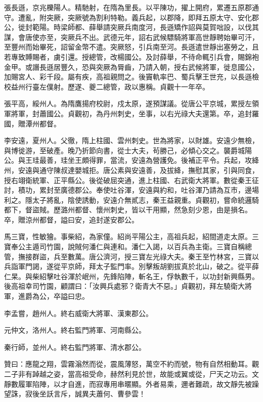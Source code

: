 \begin{pinyinscope}
 張長遜，京兆櫟陽人。精馳射，在隋為里長。以平陳功，擢上開府，累遷五原郡通守。遭亂，附突厥，突厥號為割利特勒。義兵起，以郡降，即拜五原太守、安化郡公，徙封範陽。時梁師都、薛舉請突厥兵南度河，長遜矯作詔與莫賀咄設，以伐其謀，會唐使亦至，突厥兵不出。武德元年，詔右武候驃騎將軍高世靜聘始畢可汗，至豐州而始畢死，詔留金幣不遣。突厥怒，引兵南至河。長遜遣世靜出塞勞之，且若專致賻賜者，虜引還。授總管，改楊國公。及討薛舉，不待命輒引兵會，賜錦袍金甲。或譖長遜居豐久，恐與突厥為脣齒，乃請入朝，授右武候將軍，徙息國公，加賜宮人、彩千段。屬有疾，高祖親問之。後竇軌率巴、蜀兵擊王世充，以長遜檢校益州行臺左僕射。歷遂、夔二總管，政以惠稱。貞觀十一年卒。



 張平高，綏州人。為隋鷹揚府校尉，戍太原，遂預謀議。從唐公平京城，累授左領軍將軍，封蕭國公。貞觀初，為丹州刺史，坐事，以右光祿大夫還第。卒，追封羅國，贈潭州都督。



 李安遠，夏州人。父徹，隋上柱國、雲州刺史。世為將家，以財雄。安遠少無檢，與博徙游，至破產。晚乃折節向書，從士大夫，茍勝己，必傾心交之。襲爵城陽公。與王珪最善，珪坐王頗得罪，當流，安遠為營護免。後補正平令。兵起，攻絳州，安遠與通守陳叔達嬰城拒。唐公素與安遠善，及拔絳，撫慰其家，引與同食，授右翊衛統軍、正平縣公。後從破屈突通，進上柱國、右武衛大將軍。數從秦王征討，積功，累封至廣德郡公。奉使吐谷渾，安遠與約和，吐谷渾乃請為互市，邊場利之。隱太子將亂，陰使誘動，安遠介無貳志，秦王益親重。貞觀初，嘗命統邏騎都下，督盜賊。歷潞州都督、懷州刺史，皆以干用顯，然急刻少恩，由是損名。卒，贈涼州都督，謚曰安，追封遂安郡公。



 馬三寶，性敏獪。事柴紹，為家僮。紹尚平陽公主，高祖兵起，紹間道走太原。三寶奉公主遁司竹園，說賊何潘仁與連和。潘仁入謁，以百兵為主衛。三寶自稱總管，撫接群盜，兵至數萬。唐公濟河，授三寶左光祿大夫。秦王至竹林宮，三寶以兵詣軍門謁，遂從平京師，拜太子監門率。別擊叛胡劉拔真於北山，破之。從平薛仁杲。與柴紹擊吐谷渾於岷州，先鋒陷陣，斬名王，俘執數千，以功封新興縣男。後高祖幸司竹園，顧謂曰：「汝興兵處邪？衛青大不惡。」貞觀初，拜左驍衛大將軍，進爵為公，卒謚曰忠。



 李孟嘗，趙州人。終右威衛大將軍、漢東郡公。



 元仲文，洛州人。終右監門將軍、河南縣公。



 秦行師，並州人。終右監門將軍、清水郡公。



 贊曰：應龍之翔，雲霧滃然而從，震風薄怒，萬空不約而號，物有自然相動耳。觀二子非有踔越之姿，當高祖受命，赫然利見於世，故能或翼或從，尸天之功云。文靜數履軍陷陣，以才自進，而寂專用串暱顯。外者易乘，邇者難疏，故文靜先被躁望誅，寂後坐訞言斥，誠異夫蕭何、曹參雲！



\end{pinyinscope}